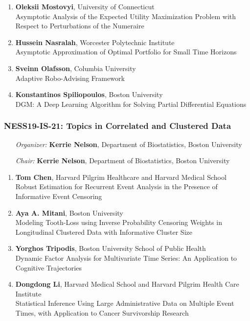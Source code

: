 \begin{enumerate}
\item \textbf{Oleksii Mostovyi}, University of Connecticut \\
Asymptotic Analysis of the Expected Utility Maximization Problem with Respect to Perturbations of the Numeraire
\item \textbf{Hussein Nasralah}, Worcester Polytechnic Institute \\
Asymptotic Approximation of Optimal Portfolio for Small Time Horizons
\item \textbf{Sveinn Olafsson}, Columbia University \\
Adaptive Robo-Advising Framework
\item \textbf{Konstantinos Spiliopoulos}, Boston University \\
DGM: A Deep Learning Algorithm for Solving Partial Differential Equations
\end{enumerate}

\subsubsection*{NESS19-IS-21: Topics in Correlated and Clustered Data}

\begin{enumerate}[align=left]
\item [\emph{Organizer:}] \textbf{Kerrie Nelson}, Department of Biostatistics, Boston University \\
\item [\emph{Chair:}] \textbf{Kerrie Nelson}, Department of Biostatistics, Boston University
\end{enumerate}

\begin{enumerate}
\item \textbf{Tom Chen}, Harvard Pilgrim Healthcare and Harvard Medical School \\
Robust Estimation for Recurrent Event Analysis in the Presence of Informative Event Censoring
\item \textbf{Aya A. Mitani}, Boston University \\
Modeling Tooth-Loss using Inverse Probability Censoring Weights in Longitudinal Clustered Data with Informative Cluster Size
\item \textbf{Yorghos Tripodis}, Boston University School of Public Health \\
Dynamic Factor Analysis for Multivariate Time Series: An Application to Cognitive Trajectories
\item \textbf{Dongdong Li}, Harvard Medical School and Harvard Pilgrim Health Care Institute \\
Statistical Inference Using Large Administrative Data on Multiple Event Times, with Application to Cancer Survivorship Research
\end{enumerate}

